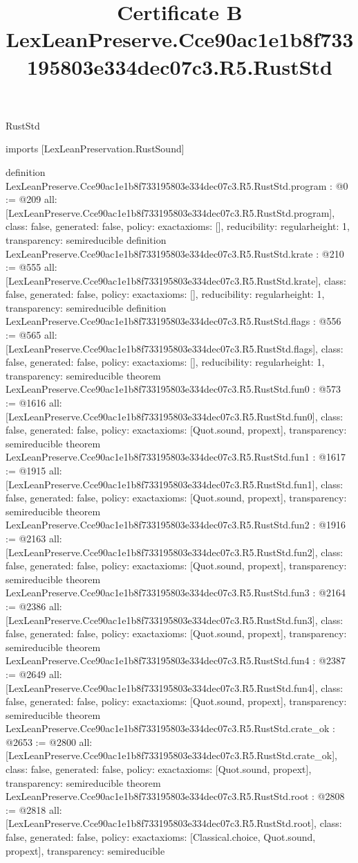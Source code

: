 \begin{lexlean}{RustStd}
\title{Certificate B LexLeanPreserve.Cce90ac1e1b8f733195803e334dec07c3.R5.RustStd}
\begin{coremodule}
imports [LexLeanPreservation.RustSound]

definition LexLeanPreserve.Cce90ac1e1b8f733195803e334dec07c3.R5.RustStd.program : @0 := @209 {
  all: [LexLeanPreserve.Cce90ac1e1b8f733195803e334dec07c3.R5.RustStd.program],
  class: false,
  generated: false,
  policy: exact{axioms: []},
  reducibility: regular{height: 1},
  transparency: semireducible
}
definition LexLeanPreserve.Cce90ac1e1b8f733195803e334dec07c3.R5.RustStd.krate : @210 := @555 {
  all: [LexLeanPreserve.Cce90ac1e1b8f733195803e334dec07c3.R5.RustStd.krate],
  class: false,
  generated: false,
  policy: exact{axioms: []},
  reducibility: regular{height: 1},
  transparency: semireducible
}
definition LexLeanPreserve.Cce90ac1e1b8f733195803e334dec07c3.R5.RustStd.flags : @556 := @565 {
  all: [LexLeanPreserve.Cce90ac1e1b8f733195803e334dec07c3.R5.RustStd.flags],
  class: false,
  generated: false,
  policy: exact{axioms: []},
  reducibility: regular{height: 1},
  transparency: semireducible
}
theorem LexLeanPreserve.Cce90ac1e1b8f733195803e334dec07c3.R5.RustStd.fun0 : @573 := @1616 {
  all: [LexLeanPreserve.Cce90ac1e1b8f733195803e334dec07c3.R5.RustStd.fun0],
  class: false,
  generated: false,
  policy: exact{axioms: [Quot.sound, propext]},
  transparency: semireducible
}
theorem LexLeanPreserve.Cce90ac1e1b8f733195803e334dec07c3.R5.RustStd.fun1 : @1617 := @1915 {
  all: [LexLeanPreserve.Cce90ac1e1b8f733195803e334dec07c3.R5.RustStd.fun1],
  class: false,
  generated: false,
  policy: exact{axioms: [Quot.sound, propext]},
  transparency: semireducible
}
theorem LexLeanPreserve.Cce90ac1e1b8f733195803e334dec07c3.R5.RustStd.fun2 : @1916 := @2163 {
  all: [LexLeanPreserve.Cce90ac1e1b8f733195803e334dec07c3.R5.RustStd.fun2],
  class: false,
  generated: false,
  policy: exact{axioms: [Quot.sound, propext]},
  transparency: semireducible
}
theorem LexLeanPreserve.Cce90ac1e1b8f733195803e334dec07c3.R5.RustStd.fun3 : @2164 := @2386 {
  all: [LexLeanPreserve.Cce90ac1e1b8f733195803e334dec07c3.R5.RustStd.fun3],
  class: false,
  generated: false,
  policy: exact{axioms: [Quot.sound, propext]},
  transparency: semireducible
}
theorem LexLeanPreserve.Cce90ac1e1b8f733195803e334dec07c3.R5.RustStd.fun4 : @2387 := @2649 {
  all: [LexLeanPreserve.Cce90ac1e1b8f733195803e334dec07c3.R5.RustStd.fun4],
  class: false,
  generated: false,
  policy: exact{axioms: [Quot.sound, propext]},
  transparency: semireducible
}
theorem LexLeanPreserve.Cce90ac1e1b8f733195803e334dec07c3.R5.RustStd.crate_ok : @2653 := @2800 {
  all: [LexLeanPreserve.Cce90ac1e1b8f733195803e334dec07c3.R5.RustStd.crate_ok],
  class: false,
  generated: false,
  policy: exact{axioms: [Quot.sound, propext]},
  transparency: semireducible
}
theorem LexLeanPreserve.Cce90ac1e1b8f733195803e334dec07c3.R5.RustStd.root : @2808 := @2818 {
  all: [LexLeanPreserve.Cce90ac1e1b8f733195803e334dec07c3.R5.RustStd.root],
  class: false,
  generated: false,
  policy: exact{axioms: [Classical.choice, Quot.sound, propext]},
  transparency: semireducible
}


\end{coremodule}
\end{lexlean}
